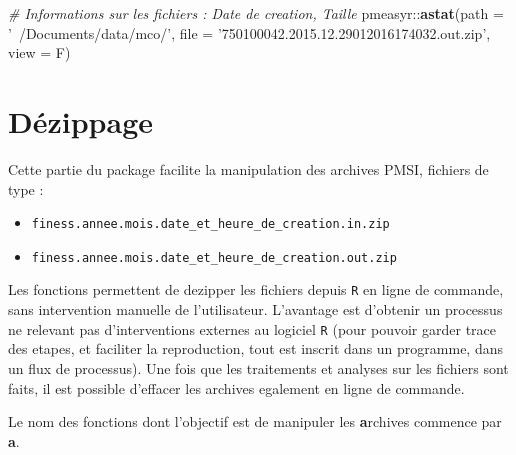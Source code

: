 \documentclass[]{book}
\newenvironment{Shaded}{\begin{snugshade}}{\end{snugshade}}
\newcommand{\KeywordTok}[1]{\textcolor[rgb]{0.13,0.29,0.53}{\textbf{{#1}}}}
\newcommand{\DataTypeTok}[1]{\textcolor[rgb]{0.13,0.29,0.53}{{#1}}}
\newcommand{\StringTok}[1]{\textcolor[rgb]{0.31,0.60,0.02}{{#1}}}
\newcommand{\CommentTok}[1]{\textcolor[rgb]{0.56,0.35,0.01}{\textit{{#1}}}}
\newcommand{\NormalTok}[1]{{#1}}
\providecommand{\tightlist}{%
  \setlength{\itemsep}{0pt}\setlength{\parskip}{0pt}}
\begin{document}
\begin{Shaded}
\begin{Highlighting}[]
\CommentTok{# Informations sur les fichiers : Date de creation, Taille}
\NormalTok{pmeasyr::}\KeywordTok{astat}\NormalTok{(}\DataTypeTok{path =} \StringTok{'~/Documents/data/mco/'}\NormalTok{, }
               \DataTypeTok{file =} \StringTok{'750100042.2015.12.29012016174032.out.zip'}\NormalTok{, }
               \DataTypeTok{view =} \NormalTok{F)}
\end{Highlighting}
\end{Shaded}

\section{Dézippage}\label{dezippage}

Cette partie du package facilite la manipulation des archives PMSI,
fichiers de type :

\begin{itemize}
\tightlist
\item
  \texttt{finess.annee.mois.date\_et\_heure\_de\_creation.in.zip}
\item
  \texttt{finess.annee.mois.date\_et\_heure\_de\_creation.out.zip}
\end{itemize}

Les fonctions permettent de dezipper les fichiers depuis \texttt{R} en
ligne de commande, sans intervention manuelle de l'utilisateur.
L'avantage est d'obtenir un processus ne relevant pas d'interventions
externes au logiciel \texttt{R} (pour pouvoir garder trace des etapes,
et faciliter la reproduction, tout est inscrit dans un programme, dans
un flux de processus). Une fois que les traitements et analyses sur les
fichiers sont faits, il est possible d'effacer les archives egalement en
ligne de commande.

Le nom des fonctions dont l'objectif est de manipuler les
\textbf{a}rchives commence par \textbf{a}.
\end{document}
